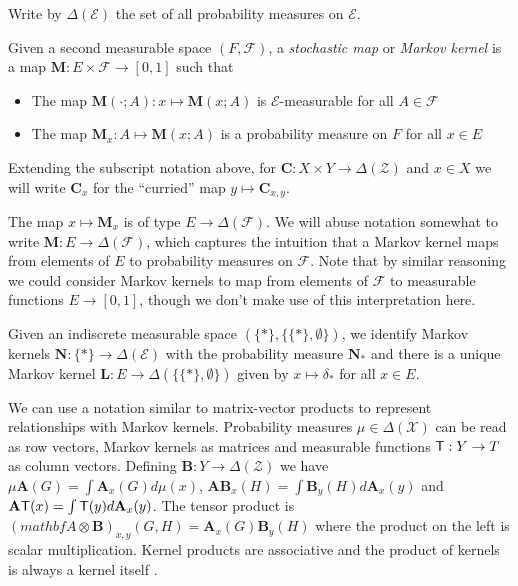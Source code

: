 Write by $\Delta(\mathcal{E})$ the set of all probability measures on $\mathcal{E}$.

Given a second measurable space $(F,\mathcal{F})$, a \emph{stochastic map} or \emph{Markov kernel} is a map $\mathbf{M}:E\times\mathcal{F}\to [0,1]$ such that
\begin{itemize}
	\item The map $\mathbf{M}(\cdot;A):x\mapsto \mathbf{M}(x;A)$ is $\mathcal{E}$-measurable for all $A\in \mathcal{F}$
	\item The map $\mathbf{M}_x:A\mapsto \mathbf{M}(x;A)$ is a probability measure on $F$ for all $x\in E$
\end{itemize}

Extending the subscript notation above, for $\mathbf{C}:X\times Y\to \Delta(\mathcal{Z})$  and $x\in X$ we will write $\mathbf{C}_x$ for the ``curried'' map $y\mapsto \mathbf{C}_{x,y}$.

The map $x\mapsto \mathbf{M}_x$ is of type $E\to \Delta(\mathcal{F})$. We will abuse notation somewhat to write $\mathbf{M}:E\to \Delta(\mathcal{F})$, which captures the intuition that a Markov kernel maps from elements of $E$ to probability measures on $\mathcal{F}$. Note that by similar reasoning we could consider Markov kernels to map from elements of $\mathcal{F}$ to measurable functions $E\to[0,1]$, though we don't make use of this interpretation here.

Given an indiscrete measurable space $(\{*\},\{\{*\},\emptyset\})$, we identify Markov kernels $\mathbf{N}:\{*\}\to \Delta(\mathcal{E})$ with the probability measure $\mathbf{N}_*$ and there is a unique Markov kernel $\mathbf{L}:E\to \Delta(\{\{*\},\emptyset\})$ given by $x\mapsto \delta_*$ for all $x\in E$.

We can use a notation similar to matrix-vector products to represent relationships with Markov kernels. Probability measures $\mu\in \Delta(\mathcal{X})$ can be read as row vectors, Markov kernels as matrices and measurable functions $\mathsf{T}:Y\to T$ as column vectors. Defining $\mathbf{B}:Y\to \Delta(\mathcal{Z})$ we have $\mu \mathbf{A} (G) = \int \mathbf{A}_x (G) d\mu(x)$, $\mathbf{A}\mathbf{B}_x(H)=\int \mathbf{B}_y(H)d\mathbf{A}_x(y)$ and $\mathbf{A}\mathsf{T}(x)=\int \mathsf{T}(y) d\mathbf{A}_x(y)$. The tensor product is $(mathbf{A}\otimes \mathbf{B})_{x,y}(G,H) = \mathbf{A}_x(G)\mathbf{B}_y(H)$ where the product on the left is scalar multiplication. Kernel products are associative and the product of kernels is always a kernel itself \citep{cinlar_probability_2011}. 

